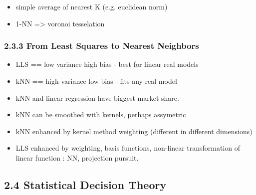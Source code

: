 \documentclass[11pt]{article}
\providecommand{\tightlist}{%
      \setlength{\itemsep}{0pt}\setlength{\parskip}{0pt}}
\begin{document}
\begin{itemize}
\tightlist
\item
  simple average of nearest K (e.g. euclidean norm)
\item
  1-NN =\textgreater{} voronoi tesselation
\end{itemize}

\subsubsection{2.3.3 From Least Squares to Nearest
Neighbors}\label{from-least-squares-to-nearest-neighbors}

\begin{itemize}
\tightlist
\item
  LLS == low variance high bias - best for linear real models
\item
  kNN == high variance low bias - fits any real model
\item
  kNN and linear regression have biggest market share.
\item
  kNN can be smoothed with kernels, perhaps assymetric
\item
  kNN enhanced by kernel method weighting (different in different
  dimensions)
\item
  LLS enhanced by weighting, basis functions, non-linear transformation
  of linear function : NN, projection pursuit.
\end{itemize}

\subsection{2.4 Statistical Decision
Theory}\label{statistical-decision-theory}
\end{document}
